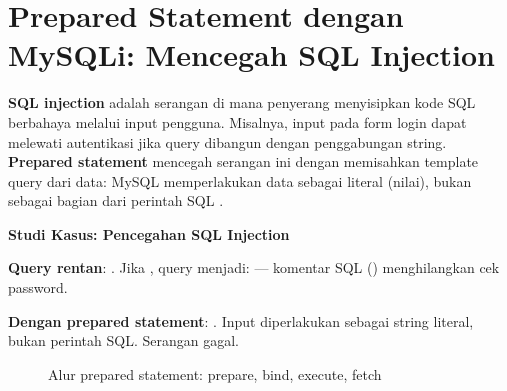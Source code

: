 ﻿\section{Prepared Statement dengan MySQLi: Mencegah SQL Injection}

\textbf{SQL injection} adalah serangan di mana penyerang menyisipkan kode SQL berbahaya melalui input pengguna. Misalnya, input  pada form login dapat melewati autentikasi jika query dibangun dengan penggabungan string. \textbf{Prepared statement} mencegah serangan ini dengan memisahkan template query dari data: MySQL memperlakukan data sebagai literal (nilai), bukan sebagai bagian dari perintah SQL \cite{phpRightWay}.

\begin{contoh}
\textbf{Studi Kasus: Pencegahan SQL Injection}

\textbf{Query rentan}: . Jika , query menjadi:  --- komentar SQL (\code{--}) menghilangkan cek password.

\textbf{Dengan prepared statement}: . Input  diperlakukan sebagai string literal, bukan perintah SQL. Serangan gagal.
\end{contoh}

\begin{figure}[H]
\centering
{}
\caption{Alur prepared statement: prepare, bind, execute, fetch}
\end{figure}

